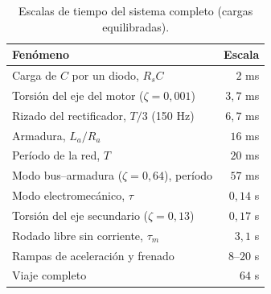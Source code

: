 \documentclass[10pt,a4paper,twocolumn]{article}
\begin{document}
\begin{table}[H]
\centering
\caption{Escalas de tiempo del sistema completo (cargas equilibradas).}
\label{tab:escalas}
\small
\begin{tabular}{@{}lr@{}}
\toprule
Fenómeno & Escala \\
\midrule
Carga de $C$ por un diodo, $R_sC$                     & $2$ ms \\
Torsión del eje del motor ($\zeta = 0{,}001$)        & $3{,}7$ ms \\
Rizado del rectificador, $T/3$ (150 Hz)               & $6{,}7$ ms \\
Armadura, $L_a/R_a$                                   & $16$ ms \\
Período de la red, $T$                                & $20$ ms \\
Modo bus--armadura ($\zeta = 0{,}64$), período        & $57$ ms \\
Modo electromecánico, $\tau$                          & $0{,}14$ s \\
Torsión del eje secundario ($\zeta = 0{,}13$)        & $0{,}17$ s \\
Rodado libre sin corriente, $\tau_m$                  & $3{,}1$ s \\
Rampas de aceleración y frenado                      & $8$--$20$ s \\
Viaje completo                                        & $64$ s \\
\bottomrule
\end{tabular}
\end{table}
\end{document}
